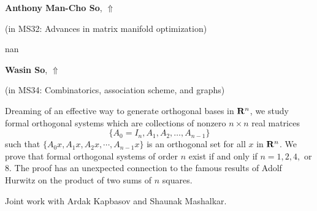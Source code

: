 \documentclass[ILAS2025-program.tex]{subfiles}
\begin{document}
     \hypertarget{down0186}{}\begin{ilasabstract}
    
    \textbf{Anthony Man-Cho So},  \hfill \hyperlink{up0186}{$\Uparrow$}
    
    (in {\color{mstitle}MS32: Advances in matrix manifold optimization})
        
        \mtskip
    nan\end{ilasabstract}
     \hypertarget{down0325}{}\begin{ilasabstract}
    
    \textbf{Wasin So},  \hfill \hyperlink{up0325}{$\Uparrow$}
    
    (in {\color{mstitle}MS34: Combinatorics, association scheme, and graphs})
        
        \mtskip
    Dreaming of an effective way to generate orthogonal bases in ${\bf R}^n$, 
we study  formal orthogonal systems which are  collections of nonzero $n \times n$  real matrices 
\[ \{A_0=I_n, A_1, A_2, \ldots,A_{n-1}\}\]
such that $\{A_0x, A_1x,A_2x,\cdots,A_{n-1}x\}$
 is an orthogonal set for all $x$ in ${\bf R}^n$. We prove that 
 formal orthogonal systems of order $n$ exist if and only if $n=1, 2,4,$ or  $8$.
 The proof has an unexpected connection to the famous results of Adolf Hurwitz
  on the product of two sums of $n$ squares.
 
 \vspace{.3in}
 
 Joint work with Ardak Kapbasov and Shaunak Mashalkar.\end{ilasabstract}
\end{document}
